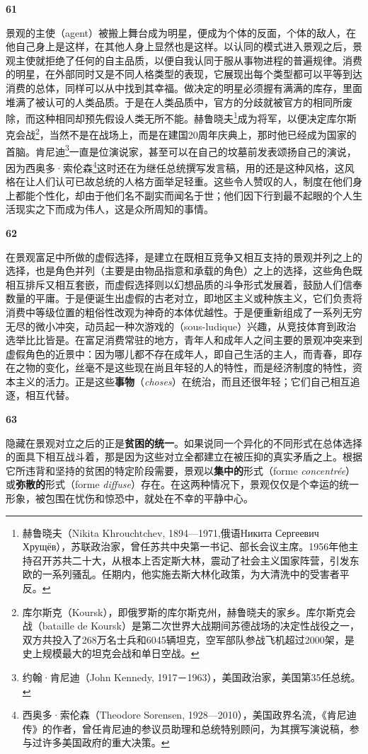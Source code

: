 \documentclass[fontset=fandol, a4paper, 12pt, openright]{ctexbook}
\makeatletter
\newcommand{\thesis}[1]{%
    \par\vspace{1.5em}%
    {\centering \textbf{\Large #1}\par}%
    \nobreak\vspace{0.5em}\nobreak
    \@afterindenttrue %
    \@afterheading    %
}
\makeatother
\begin{document}
\thesis{61}
景观的主使（agent）被搬上舞台成为明星，便成为个体的反面，个体的敌人，在他自己身上是这样，在其他人身上显然也是这样。以认同的模式进入景观之后，景观主使就拒绝了任何的自主品质，以便自我认同于服从事物进程的普遍规律。消费的明星，在外部同时又是不同人格类型的表现，它展现出每个类型都可以平等到达消费的总体，同样可以从中找到其幸福。做决定的明星必须握有满满的库存，里面堆满了被认可的人类品质。于是在人类品质中，官方的分歧就被官方的相同所废除，而这种相同却预先假设人类无所不能。赫鲁晓夫\footnote{赫鲁晓夫（Nikita Khrouchtchev, 1894—1971,俄语Никита Сергеевич Хрущёв），苏联政治家，曾任苏共中央第一书记、部长会议主席。1956年他主持召开苏共二十大，从根本上否定斯大林，震动了社会主义国家阵营，引发东欧的一系列骚乱。任期内，他实施去斯大林化政策，为大清洗中的受害者平反。}成为将军，以便决定库尔斯克会战\footnote{库尔斯克（Koursk），即俄罗斯的库尔斯克州，赫鲁晓夫的家乡。库尔斯克会战（bataille de Koursk）是第二次世界大战期间苏德战场的决定性战役之一，双方共投入了268万名士兵和6045辆坦克，空军部队参战飞机超过2000架，是史上规模最大的坦克会战和单日空战。}，当然不是在战场上，而是在建国20周年庆典上，那时他已经成为国家的首脑。肯尼迪\footnote{约翰·肯尼迪（John Kennedy, 1917－1963），美国政治家，美国第35任总统。}一直是位演说家，甚至可以在自己的坟墓前发表颂扬自己的演说，因为西奥多·索伦森\footnote{西奥多·索伦森（Theodore Sorensen, 1928—2010），美国政界名流，《肯尼迪传》的作者，曾任肯尼迪的参议员助理和总统特别顾问，为其撰写演说稿，参与过许多美国政府的重大决策。}这时还在为继任总统撰写发言稿，用的还是这种风格，这风格在让人们认可已故总统的人格方面举足轻重。这些令人赞叹的人，制度在他们身上都能个性化，却由于他们名不副实而闻名于世；他们因下行到最不起眼的个人生活现实之下而成为伟人，这是众所周知的事情。

\thesis{62}
在景观富足中所做的虚假选择，是建立在既相互竞争又相互支持的景观并列之上的选择，也是角色并列（主要是由物品指意和承载的角色）之上的选择，这些角色既相互排斥又相互套嵌，而虚假选择则以幻想品质的斗争形式发展着，鼓励人们信奉数量的平庸。于是便诞生出虚假的古老对立，即地区主义或种族主义，它们负责将消费中等级位置的粗俗性改观为神奇的本体优越性。于是便重新组成了一系列无穷无尽的微小冲突，动员起一种次游戏的（sous-ludique）兴趣，从竞技体育到政治选举比比皆是。在富足消费常驻的地方，青年人和成年人之间主要的景观冲突来到虚假角色的近景中：因为哪儿都不存在成年人，即自己生活的主人，而青春，即存在之物的变化，丝毫不是这些现在尚且年轻的人的特性，而是经济制度的特性，资本主义的活力。正是这些\textbf{事物}（\textit{choses}）在统治，而且还很年轻；它们自己相互追逐，相互代替。

\thesis{63}
隐藏在景观对立之后的正是\textbf{贫困的统一}。如果说同一个异化的不同形式在总体选择的面具下相互战斗着，那是因为这些对立全都建立在被压抑的真实矛盾之上。根据它所违背和坚持的贫困的特定阶段需要，景观以\textbf{集中的}形式（forme \textit{concentrée}）或\textbf{弥散的}形式（forme \textit{diffuse}）存在。在这两种情况下，景观仅仅是个幸运的统一形象，被包围在忧伤和惊恐中，就处在不幸的平静中心。
\end{document}
